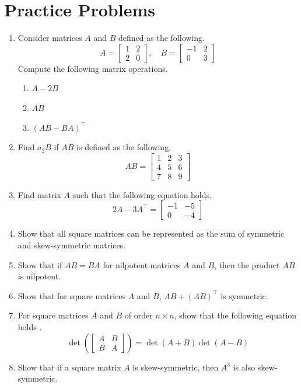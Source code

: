 \documentclass[../../main.tex]{subfiles}
\begin{document}
\section{Practice Problems}
\begin{enumerate}
\item
Consider matrices $A$ and $B$ defined as the following.
\[
A =
\begin{bmatrix}
    1 & 2 \\
    2 & 0
\end{bmatrix},
\quad
B =
\begin{bmatrix}
    -1 & 2 \\
    0  & 3
\end{bmatrix}
\]
Compute the following matrix operations.
\begin{enumerate}[noitemsep]
\item $A - 2B$
\item $AB$
\item $(AB - BA)^\intercal$
\end{enumerate}

\item
Find $a_2B$ if $AB$ is defined as the following.
\[
AB =
\begin{bmatrix}
    1 & 2 & 3 \\
    4 & 5 & 6 \\
    7 & 8 & 9
\end{bmatrix}
\]

\item
Find matrix $A$ such that the following equation holds.
\[
2A - 3A^\intercal =
\begin{bmatrix}
    -1 & -5 \\
    0  & -4
\end{bmatrix}
\]

\item
Show that all square matrices can be represented as the sum of
symmetric and skew-symmetric matrices.

\item
Show that if $AB = BA$ for nilpotent matrices $A$ and $B$, then the
product $AB$ is nilpotent.

\item
Show that for square matrices $A$ and $B$, $AB + (AB)^\intercal$
is symmetric.

\item
For square matrices $A$ and $B$ of order $n \times n$, show that
the following equation holds \cite{MATH02-3}.
\[
\det\left(
    \begin{bmatrix}
        A & B \\
        B & A
    \end{bmatrix}
\right)
= \det(A + B) \det(A - B)
\]

\item
Show that if a square matrix $A$ is skew-symmetric, then $A^3$ is
also skew-symmetric.
\end{enumerate}
\end{document}
